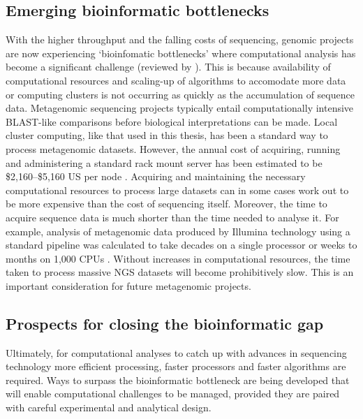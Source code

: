 \subsection{Emerging bioinformatic bottlenecks}
With the higher throughput and the falling costs of sequencing, genomic projects are now experiencing `bioinfomatic bottlenecks' where computational analysis has become a significant challenge (reviewed by \citet{Scholz2012}).
This is because availability of computational resources and scaling-up of algorithms to accomodate more data or computing clusters is not occurring as quickly as the accumulation of sequence data.
Metagenomic sequencing projects typically entail computationally intensive \acs{BLAST}-like comparisons before biological interpretations can be made.
Local cluster computing, like that used in this thesis, has been a standard way to process metagenomic datasets.
However, the annual cost of acquiring, running and administering a standard rack mount server has been estimated to be \$2,160--\$5,160 US per node \cite{Wilkening2009}.
Acquiring and maintaining the necessary computational resources to process large datasets can in some cases work out to be more expensive than the cost of sequencing itself.
Moreover, the time to acquire sequence data is much shorter than the time needed to analyse it.
For example, analysis of metagenomic data produced by Illumina technology using a standard pipeline was calculated to take decades on a single processor or weeks to months on 1,000 \acs{CPU}s \cite{Evanko2009}.
Without increases in computational resources, the time taken to process massive \ac{NGS} datasets will become prohibitively slow.
This is an important consideration for future metagenomic projects.

\subsection{Prospects for closing the bioinformatic gap}
Ultimately, for computational analyses to catch up with advances in sequencing technology more efficient processing, faster processors and faster algorithms are required.
Ways to surpass the bioinformatic bottleneck are being developed that will enable computational challenges to be managed, provided they are paired with careful experimental and analytical design.

